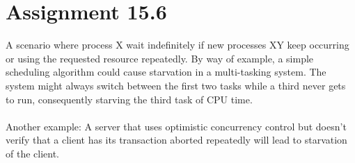 \section{Assignment 15.6}
A scenario where process X wait indefinitely if new processes XY keep occurring or using the requested resource repeatedly. By way of example, a simple scheduling algorithm could cause starvation in a multi-tasking system. The system might always switch between the first two tasks while a third never gets to run, consequently starving the third task of CPU time.\\\\

Another example: A server that uses optimistic concurrency control but doesn’t verify that a client has its transaction aborted repeatedly will lead to starvation of the client.
